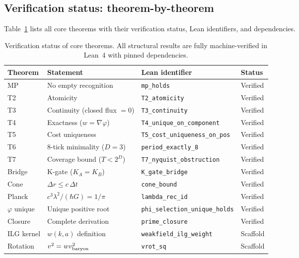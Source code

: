 \documentclass[11pt]{article}
\begin{document}
\subsection{Verification status: theorem-by-theorem}

Table~\ref{tab:verification-status} lists all core theorems with their verification status, Lean identifiers, and dependencies.

\begin{table}[htbp]
\centering
\small
\caption{Verification status of core theorems. All structural results are fully machine-verified in Lean~4 with pinned dependencies.}
\label{tab:verification-status}
\begin{tabular}{@{}llp{5.5cm}l@{}}
\toprule
\textbf{Theorem} & \textbf{Statement} & \textbf{Lean identifier} & \textbf{Status} \\
\midrule
MP & No empty recognition & \texttt{mp\_holds} & Verified \\
T2 & Atomicity & \texttt{T2\_atomicity} & Verified \\
T3 & Continuity (closed flux $=0$) & \texttt{T3\_continuity} & Verified \\
T4 & Exactness ($w=\nabla\varphi$) & \texttt{T4\_unique\_on\_component} & Verified \\
T5 & Cost uniqueness & \texttt{T5\_cost\_uniqueness\_on\_pos} & Verified \\
T6 & 8-tick minimality ($D=3$) & \texttt{period\_exactly\_8} & Verified \\
T7 & Coverage bound ($T<2^D$) & \texttt{T7\_nyquist\_obstruction} & Verified \\
Bridge & K-gate ($K_A=K_B$) & \texttt{K\_gate\_bridge} & Verified \\
Cone & $\Delta r \le c\,\Delta t$ & \texttt{cone\_bound} & Verified \\
Planck & $c^3\lambda^2/(\hbar G)=1/\pi$ & \texttt{lambda\_rec\_id} & Verified \\
$\varphi$ unique & Unique positive root & \texttt{phi\_selection\_unique\_holds} & Verified \\
Closure & Complete derivation & \texttt{prime\_closure} & Verified \\
\midrule
ILG kernel & $w(k,a)$ definition & \texttt{weakfield\_ilg\_weight} & Scaffold \\
Rotation & $v^2=wv_{\rm baryon}^2$ & \texttt{vrot\_sq} & Scaffold \\
\bottomrule
\end{tabular}
\end{table}
\end{document}
